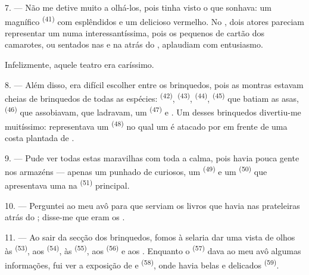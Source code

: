 7. --- Não me detive muito a olhá-los, pois tinha visto o que sonhava: um
magnífico  \textsuperscript{(41)} com esplêndidos
 e um delicioso  vermelho. No ,
dois atores pareciam representar um  numa 
interessantíssima, pois os pequenos  de cartão dos
camarotes, ou sentados nas  e na  atrás do
, aplaudiam com entusiasmo.

Infelizmente, aquele teatro era caríssimo.

8. --- Além disso, era difícil escolher entre os brinquedos, pois as
montras estavam cheias de brinquedos de todas as espécies:
 \textsuperscript{(42)},  \textsuperscript{(43)},
 \textsuperscript{(44)},  \textsuperscript{(45)} que batiam
as asas,  \textsuperscript{(46)} que assobiavam,  que ladravam, um  \textsuperscript{(47)} e
. Um desses brinquedos divertiu-me muitíssimo:
representava um  \textsuperscript{(48)} no qual um
 é atacado por  em frente de uma costa
plantada de .


9. --- Pude ver todas estas maravilhas com toda a calma, pois havia pouca
gente nos armazéns --- apenas um punhado de curiosos, um 
\textsuperscript{(49)} e um  \textsuperscript{(50)} que apresentava uma
 na  \textsuperscript{(51)} principal.

10. --- Perguntei ao meu avô para que serviam os livros que havia nas
prateleiras atrás do ; disse-me que eram os .

\VUsaut{3.6mm}
\VUsaut{2.8mm}

11. --- Ao sair da secção dos brinquedos, fomos à selaria dar uma vista de
olhos às  \textsuperscript{(53)}, aos 
\textsuperscript{(54)}, às  \textsuperscript{(55)}, aos 
\textsuperscript{(56)} e aos . Enquanto o 
\textsuperscript{(57)} dava ao meu avô algumas informações, fui ver a exposição
de  e  \textsuperscript{(58)}, onde havia belas
 e delicados  \textsuperscript{(59)}.

